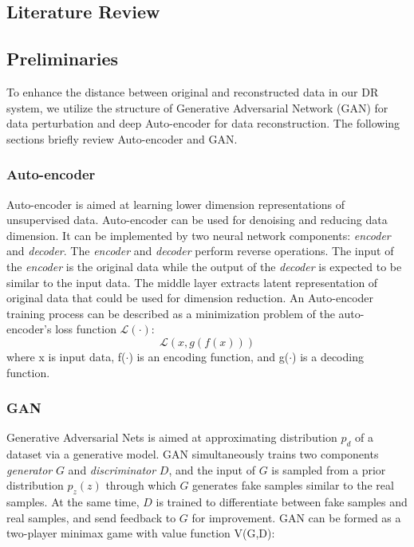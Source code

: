 \documentclass[final,5p,twocolumn]{elsarticle}
\begin{document}
	\subsection{Literature Review}
	
	
	\subsection{Preliminaries}
	To enhance the distance between original and reconstructed data in our DR system, we utilize the structure of Generative Adversarial Network (GAN) \cite{Goodfellow2014} for data perturbation and deep Auto-encoder \cite{Baldi2012} for data reconstruction. The following sections briefly review Auto-encoder and GAN.
	\subsubsection{Auto-encoder}
	Auto-encoder is aimed at learning lower dimension representations of unsupervised data. Auto-encoder can be used for denoising and reducing data dimension. It can be implemented by two neural network components: \textit{encoder} and \textit{decoder}. The \textit{encoder} and \textit{decoder} perform reverse operations. The input of the \textit{encoder} is the original data while the output of the \textit{decoder} is expected to be similar to the input data. The middle layer extracts latent representation of original data that could be used for dimension reduction. An Auto-encoder training process can be described as a minimization problem of the auto-encoder's loss function $\mathcal{L(\cdot)}$:
	\begin{equation}
	\mathcal{L}(x,g(f(x)))
	\end{equation}
	where x is input data, f($\cdot$) is an encoding function, and g($\cdot$) is a decoding function.
	
	\subsubsection{GAN}
	Generative Adversarial Nets is aimed at approximating distribution $p_d$ of a dataset via a generative model. GAN simultaneously trains two components \textit{generator} $G$ and \textit{discriminator} $D$, and the input of $G$ is sampled from a prior distribution $p_z(z)$ through which $G$ generates fake samples similar to the real samples. At the same time, $D$ is trained to differentiate between fake samples and real samples, and send feedback to $G$ for improvement. GAN can be formed as a two-player minimax game with value function V(G,D):
	
\end{document}
